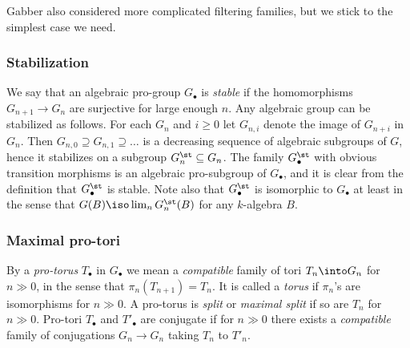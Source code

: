 \documentclass[10pt]{../fichiers-configuration-latex/smfart}
\begin{document}
\begin{remark2} Gabber also considered more complicated filtering
families, but we stick to the simplest case we need.  \end{remark2}

\subsubsection{Stabilization}\label{8-stabsec} We say that an
algebraic pro-group $G_\bullet$ is {\em stable} if the homomorphisms
$G_{n+1}\to G_n$ are surjective for large enough $n$. Any algebraic
group can be stabilized as follows. For each $G_n$ and $i\ge
0$ let $G_{n,i}$ denote the image of $G_{n+i}$ in $G_n$. Then
$G_{n,0}\supseteq G_{n,1}\supseteq\dots$ is a decreasing sequence
of algebraic subgroups of $G$, hence it stabilizes on a subgroup
$G^\st_n\subseteq G_n$. The family $G^\st_\bullet$ with obvious
transition morphisms is an algebraic pro-subgroup of $G_\bullet$, and
it is clear from the definition that $G^\st_\bullet$ is stable. Note
also that $G_\bullet^\st$ is isomorphic to $G_\bullet$ at least in the
sense that $G(B)\iso\lim_n G^\st_n(B)$ for any $k$-algebra $B$.

\subsubsection{Maximal pro-tori}\label{8-maxtorsec} By a {\em
pro-torus} $T_\bullet$ in $G_\bullet$ we mean a {\em compatible}
family of tori $T_n\into G_n$  for $n\gg 0$, in the sense that
$\pi_n(T_{n+1})=T_n$. It is  called a {\em torus} if $\pi_n$'s
are isomorphisms for $n\gg 0$. A pro-torus is {\em split} or {\em
maximal split} if so are $T_n$ for $n\gg 0$. Pro-tori $T_\bullet$
and $T'_\bullet$ are conjugate if for $n\gg 0$ there exists a {\em
compatible} family of conjugations $G_n\to G_n$ taking $T_n$
to $T'_n$.
\end{document}
